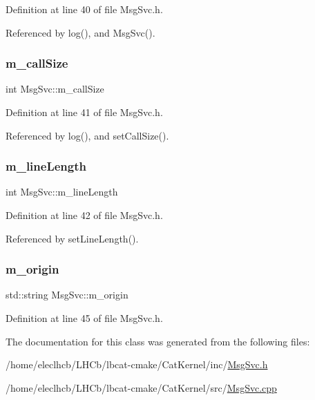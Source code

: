 Definition at line 40 of file Msg\+Svc.\+h.



Referenced by log(), and Msg\+Svc().

\mbox{\label{classMsgSvc_ab22aa5d8130cbb94246c4192440d41fb}} 
\subsubsection{\texorpdfstring{m\+\_\+call\+Size}{m\_callSize}}
{\footnotesize\ttfamily int Msg\+Svc\+::m\+\_\+call\+Size\hspace{0.3cm}{\ttfamily [private]}}



Definition at line 41 of file Msg\+Svc.\+h.



Referenced by log(), and set\+Call\+Size().

\mbox{\label{classMsgSvc_a63c500a8e8573e6e68e0c2966920ddaa}} 
\subsubsection{\texorpdfstring{m\+\_\+line\+Length}{m\_lineLength}}
{\footnotesize\ttfamily int Msg\+Svc\+::m\+\_\+line\+Length\hspace{0.3cm}{\ttfamily [private]}}



Definition at line 42 of file Msg\+Svc.\+h.



Referenced by set\+Line\+Length().

\mbox{\label{classMsgSvc_a2bf08fec17ae56486896dc6934528442}} 
\subsubsection{\texorpdfstring{m\+\_\+origin}{m\_origin}}
{\footnotesize\ttfamily std\+::string Msg\+Svc\+::m\+\_\+origin\hspace{0.3cm}{\ttfamily [private]}}



Definition at line 45 of file Msg\+Svc.\+h.



The documentation for this class was generated from the following files\+:\begin{DoxyCompactItemize}
\item 
/home/eleclhcb/\+L\+H\+Cb/lbcat-\/cmake/\+Cat\+Kernel/inc/\hyperlink{MsgSvc_8h}{Msg\+Svc.\+h}\item 
/home/eleclhcb/\+L\+H\+Cb/lbcat-\/cmake/\+Cat\+Kernel/src/\hyperlink{MsgSvc_8cpp}{Msg\+Svc.\+cpp}\end{DoxyCompactItemize}
